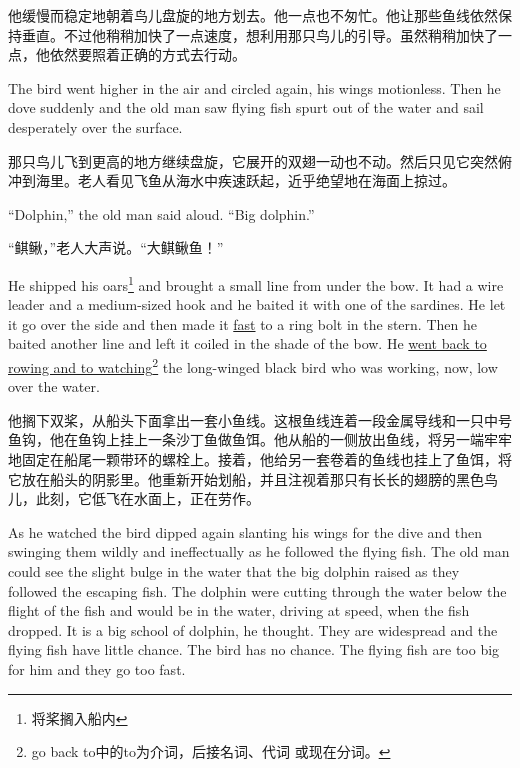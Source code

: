 \begin{paracol}{2}
\switchcolumn

他缓慢而稳定地朝着鸟儿盘旋的地方划去。他一点也不匆忙。他让那些鱼线依然保持垂直。不过他稍稍加快了一点速度，想利用那只鸟儿的引导。虽然稍稍加快了一点，他依然要照着正确的方式去行动。

\switchcolumn*

The bird went higher in the air and circled again, his wings
\gls{motionless}. Then he \gls{dove} suddenly and the old man saw flying
fish \gls{spurt} out of the water and sail \gls{desperately} over the surface.

\switchcolumn

那只鸟儿飞到更高的地方继续盘旋，它展开的双翅一动也不动。然后只见它突然俯冲到海里。老人看见飞鱼从海水中疾速跃起，近乎绝望地在海面上掠过。

\switchcolumn*

``Dolphin,'' the old man said aloud. ``Big dolphin.''

\switchcolumn

“鲯鳅，”老人大声说。“大鲯鳅鱼！”

\switchcolumn*

He shipped his oars\footnote{将桨搁入船内} and brought a small line from
under the bow. It had a \gls{wire} \gls{leader} and a medium-sized hook and
he baited it with one of the sardines. He let it go over the side and then
made it \uline{fast} to a ring \gls{bolt} in the stern. Then he baited
another line and left it coiled in the shade of the bow. He \uline{went back
  to rowing and to watching}\footnote{go back to中的to为介词，后接名词、代词
  或现在分词。} the long-winged black bird who was working, now, low over
the water.

\switchcolumn

他搁下双桨，从船头下面拿出一套小鱼线。这根鱼线连着一段金属导线和一只中号鱼钩，他在鱼钩上挂上一条沙丁鱼做鱼饵。他从船的一侧放出鱼线，将另一端牢牢地固定在船尾一颗带环的螺栓上。接着，他给另一套卷着的鱼线也挂上了鱼饵，将它放在船头的阴影里。他重新开始划船，并且注视着那只有长长的翅膀的黑色鸟儿，此刻，它低飞在水面上，正在劳作。

\switchcolumn*

As he watched the bird dipped again slanting his wings for the dive and then
\gls{swinging} them wildly and \gls{ineffectually} as he followed the flying fish.
The old man could see the \gls{slight} \gls{bulge} in the water that the big
dolphin raised as they followed the escaping fish. The dolphin were cutting
through the water below the flight of the fish and would be in the water,
driving at speed, when the fish dropped. It is a big school of dolphin, he
thought. They are \gls{widespread} and the flying fish have little
\gls{chance}. The bird has no chance. The flying fish are too big for him
and they go too fast.


\end{paracol}
